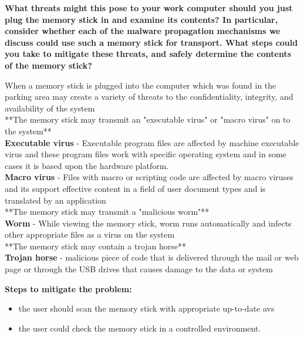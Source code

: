\documentclass[../CIT288SecurityResearchNotebook.tex]{subfiles}
\begin{document}
{\bf{What threats might this pose to your work computer should you just plug the memory stick in and examine its contents? In particular, consider whether each of the malware propagation mechanisms we discuss could use such a memory stick for transport. What steps could you take to mitigate these threats, and safely determine the contents of the memory stick? }}


When a memory stick is plugged into the computer which was found in the 
parking area may create a variety of threats to the confidentiality, 
integrity, and availability of the system 
\\**The memory stick may transmit an "executable virus" or "macro virus" on to the system**
\\{\bf{Executable virus}} - Executable program files are affected by machine executable virus and these program files work with specific operating system and in some cases it is based upon the hardware platform.
\\{\bf{Macro virus}} - Files with macro or scripting code are affected by macro viruses and its support effective content in a field of user document types and is translated by an application
\\**The memory stick may transmit a "malicious worm"**
\\{\bf{Worm}} - While viewing the memory stick, worm runs automatically and infects other appropriate files as a virus on the system
\\**The memory stick may contain a trojan horse**
\\{\bf{Trojan horse}} - malicious piece of code that is delivered through the mail or web page or through the USB drives that causes damage to the data or system


	\begin{center}
\item{{\bf{Steps to mitigate the problem:}}}
	\end{center}
\begin{itemize}
\item{the user should scan the memory stick with appropriate up-to-date avs} 
\item{the user could check the memory stick in a controlled environment.} 
\end{itemize}
\end{document}
